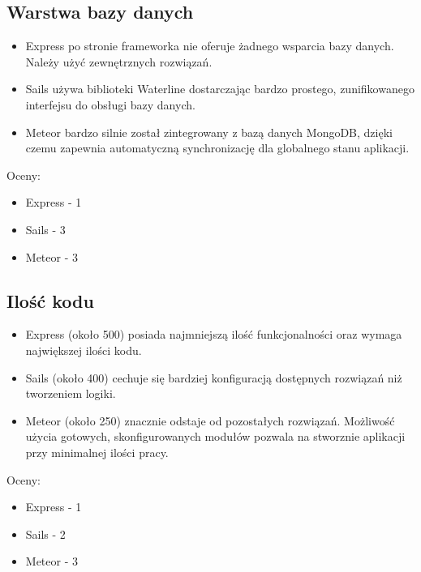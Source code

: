 \documentclass[12pt]{report}
\begin{document}
    \subsection{Warstwa bazy danych}
      \begin{itemize}
        \item Express po stronie frameworka nie oferuje żadnego wsparcia bazy danych. Należy użyć zewnętrznych rozwiązań.
        \item Sails używa biblioteki Waterline dostarczając bardzo prostego, zunifikowanego interfejsu do obsługi bazy danych.
        \item Meteor bardzo silnie został zintegrowany z bazą danych MongoDB, dzięki czemu zapewnia automatyczną synchronizację dla globalnego stanu aplikacji.
      \end{itemize}
      Oceny:
      \begin{itemize}
        \item Express - 1
        \item Sails - 3
        \item Meteor - 3
      \end{itemize}
      
    \subsection{Ilość kodu}
      \begin{itemize}
        \item Express (około 500) posiada najmniejszą ilość funkcjonalności oraz wymaga największej ilości kodu.
        \item Sails (około 400) cechuje się bardziej konfiguracją dostępnych rozwiązań niż tworzeniem logiki. 
        \item Meteor (około 250) znacznie odstaje od pozostałych rozwiązań. Możliwość użycia gotowych, skonfigurowanych modułów pozwala na stworznie aplikacji przy minimalnej ilości pracy.
      \end{itemize}
      Oceny:
      \begin{itemize}
        \item Express - 1
        \item Sails - 2
        \item Meteor - 3
      \end{itemize}
      
\end{document}

